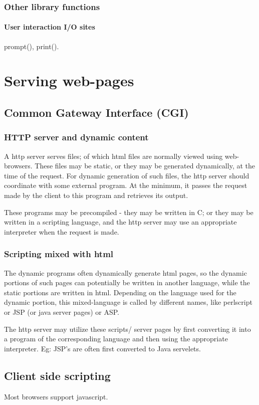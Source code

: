 \documentclass[oneside, article]{memoir}
\begin{document}
\section{Other library functions}
\subsection{User interaction I/O sites}
prompt(), print().

\part{Serving web-pages}
\chapter{Common Gateway Interface (CGI)}
\section{HTTP server and dynamic content}
A http server serves files; of which html files are normally viewed using web-browsers. These files may be static, or they may be generated dynamically, at the time of the request. For dynamic generation of such files, the http server should coordinate with some external program. At the minimum, it passes the request made by the client to this program and retrieves its output.

These programs may be precompiled - they may be written in C; or they may be written in a scripting language, and the http server may use an appropriate interpreter when the request is made.

\section{Scripting mixed with html}
The dynamic programs often dynamically generate html pages, so the dynamic portions of such pages can potentially be written in another language, while the static portions are written in html. Depending on the language used for the dynamic portion, this mixed-language is called by different names, like perlscript or JSP (or java server pages) or ASP.

The http server may utilize these scripts/ server pages by first converting it into a program of the corresponding language and then using the appropriate interpreter. Eg: JSP's are often first converted to Java servelets.

\chapter{Client side scripting}
Most browsers support javascript.
\end{document}
